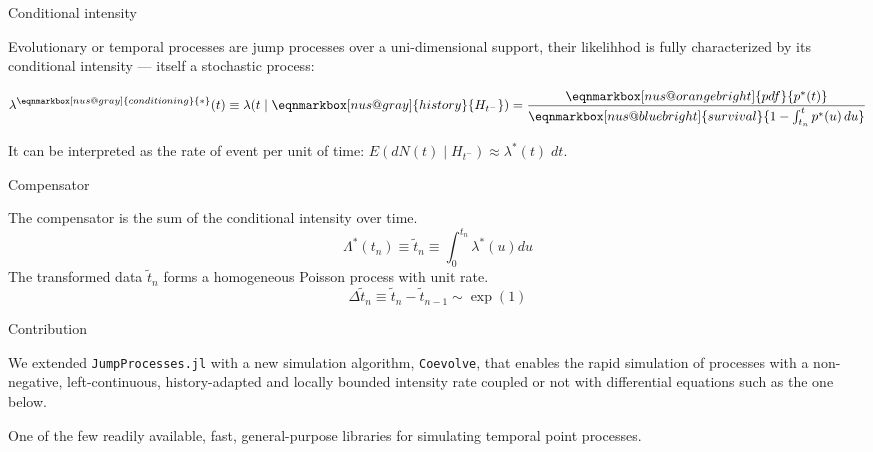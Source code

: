 \documentclass[
  ignorenonframetext,
  aspectratio=169,
  xcolor={dvipsnames,rgb}
]{beamer}
\begin{document}
\begin{frame}{Conditional intensity}

Evolutionary or temporal processes are jump processes over a uni-dimensional support, their likelihhod is fully characterized by its conditional intensity --- itself a stochastic process:

\vspace{2em}

\[
  \lambda^{\eqnmarkbox[nus@gray]{conditioning}{\ast}} (t) \equiv \lambda(t \mid \eqnmarkbox[nus@gray]{history}{H_{t^-}}) = 
    \frac{
      \eqnmarkbox[nus@orangebright]{pdf}{p^\ast(t)}
    }{
      \eqnmarkbox[nus@bluebright]{survival}{1 - \int_{t_n}^{t} p^\ast(u) \, du}
    }
\]


\vspace{4em}

It can be interpreted as the rate of event per unit of time: \( E(dN(t) \mid H_{t^-}) \approx \lambda^\ast(t) \; dt \). 

\end{frame}

\begin{frame}{Compensator}

The compensator is the sum of the conditional intensity over time.
\[
  \Lambda^\ast (t_n) \equiv \tilde{t}_n \equiv \int_0^{t_n} \lambda^\ast (u) du
\]
The transformed data \( \tilde{t}_n \) forms a homogeneous Poisson process with unit rate.
\[
  \Delta \tilde{t}_n \equiv \tilde{t}_n - \tilde{t}_{n-1} \sim \exp(1)
\]

\end{frame}

\begin{frame}{Contribution}


\vspace{-3em}

We extended \texttt{JumpProcesses.jl} with a new simulation algorithm, \texttt{Coevolve}, that enables the rapid simulation of processes with a non-negative, left-continuous, history-adapted and locally bounded intensity rate coupled or not with differential equations such as the one below.

\vspace{5em}

One of the few readily available, fast, general-purpose libraries for simulating temporal point processes.

\end{frame}
\end{document}
